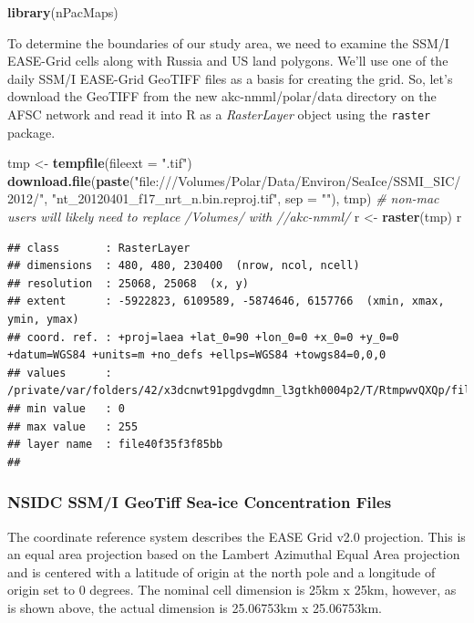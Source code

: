 \documentclass[]{article}
\newenvironment{Shaded}{}{}
\newcommand{\KeywordTok}[1]{\textcolor[rgb]{0.00,0.44,0.13}{\textbf{{#1}}}}
\newcommand{\DataTypeTok}[1]{\textcolor[rgb]{0.56,0.13,0.00}{{#1}}}
\newcommand{\StringTok}[1]{\textcolor[rgb]{0.25,0.44,0.63}{{#1}}}
\newcommand{\CommentTok}[1]{\textcolor[rgb]{0.38,0.63,0.69}{\textit{{#1}}}}
\newcommand{\NormalTok}[1]{{#1}}
\begin{document}
\begin{Shaded}
\begin{Highlighting}[]
\KeywordTok{library}\NormalTok{(nPacMaps)}
\end{Highlighting}
\end{Shaded}
To determine the boundaries of our study area, we need to examine the
SSM/I EASE-Grid cells along with Russia and US land polygons. We'll use
one of the daily SSM/I EASE-Grid GeoTIFF files as a basis for creating
the grid. So, let's download the GeoTIFF from the new
akc-nmml/polar/data directory on the AFSC network and read it into R as
a \emph{RasterLayer} object using the \texttt{raster} package.

\begin{Shaded}
\begin{Highlighting}[]
\NormalTok{tmp <- }\KeywordTok{tempfile}\NormalTok{(}\DataTypeTok{fileext =} \StringTok{".tif"}\NormalTok{)}
\KeywordTok{download.file}\NormalTok{(}\KeywordTok{paste}\NormalTok{(}\StringTok{"file:///Volumes/Polar/Data/Environ/SeaIce/SSMI_SIC/2012/"}\NormalTok{, }
    \StringTok{"nt_20120401_f17_nrt_n.bin.reproj.tif"}\NormalTok{, }\DataTypeTok{sep =} \StringTok{""}\NormalTok{), tmp)}
\CommentTok{# non-mac users will likely need to replace /Volumes/ with //akc-nmml/}
\NormalTok{r <- }\KeywordTok{raster}\NormalTok{(tmp)}
\NormalTok{r}
\end{Highlighting}
\end{Shaded}
\begin{verbatim}
## class       : RasterLayer 
## dimensions  : 480, 480, 230400  (nrow, ncol, ncell)
## resolution  : 25068, 25068  (x, y)
## extent      : -5922823, 6109589, -5874646, 6157766  (xmin, xmax, ymin, ymax)
## coord. ref. : +proj=laea +lat_0=90 +lon_0=0 +x_0=0 +y_0=0 +datum=WGS84 +units=m +no_defs +ellps=WGS84 +towgs84=0,0,0 
## values      : /private/var/folders/42/x3dcnwt91pgdvgdmn_l3gtkh0004p2/T/RtmpwvQXQp/file40f35f3f85bb.tif 
## min value   : 0 
## max value   : 255 
## layer name  : file40f35f3f85bb 
## 
\end{verbatim}

\subsubsection{NSIDC SSM/I GeoTiff Sea-ice Concentration Files}

The coordinate reference system describes the EASE Grid v2.0 projection.
This is an equal area projection based on the Lambert Azimuthal Equal
Area projection and is centered with a latitude of origin at the north
pole and a longitude of origin set to 0 degrees. The nominal cell
dimension is 25km x 25km, however, as is shown above, the actual
dimension is 25.06753km x 25.06753km.
\end{document}
